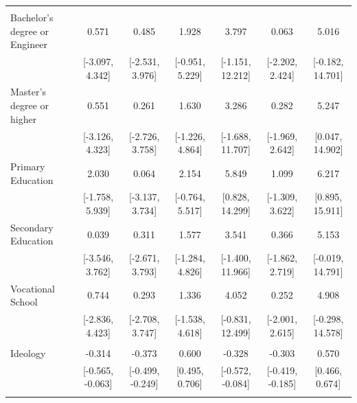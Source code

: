 \documentclass[
  10,
  letterpaper,
  DIV=11,
  numbers=noendperiod]{scrartcl}
\begin{document}
\begin{table}
\begin{tabular}[t]{lcccccc}
\addlinespace[0.3em]
\multicolumn{7}{l}{\cellcolor[HTML]{3498DB}{\textbf{Education}}}\\
\hspace{1em}Bachelor's degree or Engineer & 0.571 & 0.485 & 1.928 & 3.797 & 0.063 & 5.016\\
\hspace{1em} & {}[-3.097, 4.342] & {}[-2.531, 3.976] & {}[-0.951, 5.229] & {}[-1.151, 12.212] & {}[-2.202, 2.424] & {}[-0.182, 14.701]\\
\hspace{1em}Master's degree or higher & 0.551 & 0.261 & 1.630 & 3.286 & 0.282 & 5.247\\
\hspace{1em} & {}[-3.126, 4.323] & {}[-2.726, 3.758] & {}[-1.226, 4.864] & {}[-1.688, 11.707] & {}[-1.969, 2.642] & {}[0.047, 14.902]\\
\hspace{1em}Primary Education & 2.030 & 0.064 & 2.154 & 5.849 & 1.099 & 6.217\\
\hspace{1em} & {}[-1.758, 5.939] & {}[-3.137, 3.734] & {}[-0.764, 5.517] & {}[0.828, 14.299] & {}[-1.309, 3.622] & {}[0.895, 15.911]\\
\hspace{1em}Secondary Education & 0.039 & 0.311 & 1.577 & 3.541 & 0.366 & 5.153\\
\hspace{1em} & {}[-3.546, 3.762] & {}[-2.671, 3.793] & {}[-1.284, 4.826] & {}[-1.400, 11.966] & {}[-1.862, 2.719] & {}[-0.019, 14.791]\\
\hspace{1em}Vocational School & 0.744 & 0.293 & 1.336 & 4.052 & 0.252 & 4.908\\
\hspace{1em} & {}[-2.836, 4.423] & {}[-2.708, 3.747] & {}[-1.538, 4.618] & {}[-0.831, 12.499] & {}[-2.001, 2.615] & {}[-0.298, 14.578]\\
\addlinespace[0.3em]
\multicolumn{7}{l}{\cellcolor[HTML]{3498DB}{\textbf{Ideology}}}\\
\hspace{1em}Ideology & -0.314 & -0.373 & 0.600 & -0.328 & -0.303 & 0.570\\
\hspace{1em} & {}[-0.565, -0.063] & {}[-0.499, -0.249] & {}[0.495, 0.706] & {}[-0.572, -0.084] & {}[-0.419, -0.185] & {}[0.466, 0.674]\\
\addlinespace[0.3em]
\multicolumn{7}{l}{\cellcolor[HTML]{3498DB}{\textbf{Minority}}}\\

\end{tabular}
\end{table}
\end{document}
